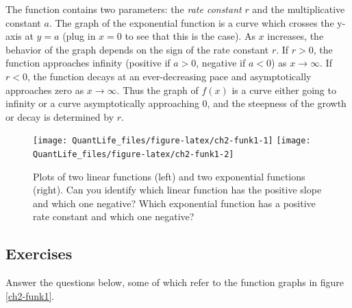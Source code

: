\documentclass[
]{book}
\theoremstyle{definition}
\theoremstyle{definition}
\theoremstyle{definition}
\theoremstyle{remark}
\begin{document}
The function contains two parameters: the \emph{rate constant} \(r\) and the multiplicative constant \(a\). The graph of the exponential function is a curve which crosses the y-axis at \(y=a\) (plug in \(x=0\) to see that this is the case). As \(x\) increases, the behavior of the graph depends on the sign of the rate constant \(r\). If \(r>0\), the function approaches infinity (positive if \(a>0\), negative if \(a<0\)) as \(x \to \infty\). If \(r<0\), the function decays at an ever-decreasing pace and asymptotically approaches zero as \(x \to \infty\). Thus the graph of \(f(x)\) is a curve either going to infinity or a curve asymptotically approaching 0, and the steepness of the growth or decay is determined by \(r\).

\begin{figure}

{\centering \texttt{[image: QuantLife\_files/figure-latex/ch2-funk1-1]} \texttt{[image: QuantLife\_files/figure-latex/ch2-funk1-2]} 

}

\caption{Plots of two linear functions (left) and two exponential functions (right). Can you identify which linear function has the positive slope and which one negative? Which exponential function has a positive rate constant and which one negative?}\label{fig:ch2-funk1}
\end{figure}

\hypertarget{exercises-2}{%
\subsection{Exercises}\label{exercises-2}}

Answer the questions below, some of which refer to the function graphs in figure \ref{ch2-funk1}.
\end{document}
